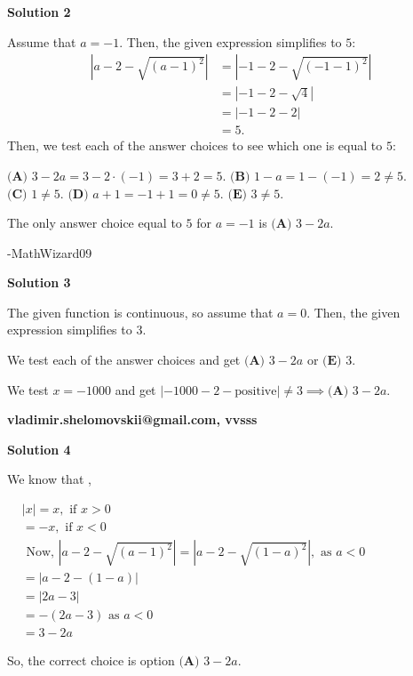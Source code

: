 \begin{enumerate}
 



\textbf{Solution 2}

Assume that $a=-1.$ Then, the given expression simplifies to $5$:
 \begin{align*} \left|a-2-\sqrt{(a-1)^2}\right| &= \left|-1-2-\sqrt{(-1-1)^2}\right| \\ &= \left|-1-2-\sqrt{4}\right| \\ &= \left|-1-2-2\right| \\ &= 5. \end{align*}
Then, we test each of the answer choices to see which one is equal to $5$:

 $\textbf{(A) } 3-2a = 3-2\cdot(-1) = 3+2 = 5.$
$\textbf{(B) } 1-a = 1-(-1) = 2 \neq 5.$
$\textbf{(C) } 1 \neq 5.$
$\textbf{(D) } a+1 = -1+1 = 0 \neq 5.$
$\textbf{(E) } 3 \neq 5.$

 The only answer choice equal to $5$ for $a=-1$ is $\boxed{\textbf{(A) } 3-2a}.$

 -MathWizard09

 



\textbf{Solution 3}

The given function is continuous, so assume that $a=0.$ Then, the given expression simplifies to $3.$

 We test each of the answer choices and get $\textbf{(A) } 3-2a$ or $\textbf{(E) } 3.$

 We test $x = - 1000$ and get  $\left|-1000-2- \text{positive} \right| \ne 3 \implies \boxed{\textbf{(A) } 3-2a}.$

 \textbf{vladimir.shelomovskii@gmail.com, vvsss}

 



\textbf{Solution 4}

We know that ,

 \(\begin{aligned} & |x|=x, \text { if } x>0 \\ & =-x, \text { if } x<0 \\ & \text { Now, }\left|a-2-\sqrt{(a-1)^2}\right|=\left|a-2-\sqrt{(1-a)^2}\right|, \text { as }  a<0 \\ & =|a-2-(1-a)| \\ & =|2 a-3| \\ & =-(2 a-3) \text { as } a<0 \\ & =3-2 a\end{aligned}\) 

 So, the correct choice is option $\boxed{\textbf{(A) } 3-2a}.$





\end{enumerate}
